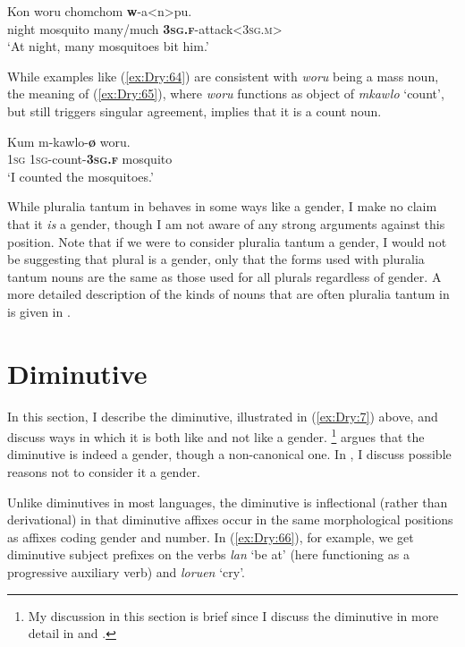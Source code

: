 \documentclass[output=collectionpaper]{langsci/langscibook}
\begin{document}
\ea    \label{ex:Dry:64}
\gll Kon	woru	chomchom	\textbf{w}-a<n>pu.\\
night mosquito many/much \textbf{\textsc{3sg.f}}-attack<\textsc{3sg.m}>\\
\glt `At night, many mosquitoes bit him.'
\z

While examples like (\ref{ex:Dry:64}) are consistent with \textit{woru} being a mass noun, the meaning of (\ref{ex:Dry:65}), where \textit{woru} functions as object of \textit{mkawlo} `count', but still triggers singular agreement, implies that it is a count noun.

\ea \label{ex:Dry:65}
\gll Kum	m-kawlo-\textbf{ø}	woru.\\
\textsc{1sg} \textsc{1sg}-count-\textbf{\textsc{3sg.f}} mosquito\\
\glt  `I counted the mosquitoes.'
\z

While pluralia tantum in  behaves in some ways like a gender, I make no claim that it \textit{is} a gender, though I am not aware of any strong arguments against this position. Note that if we were to consider pluralia tantum a gender, I would not be suggesting that plural is a gender, only that the forms used with pluralia tantum nouns are the same as those used for all plurals regardless of gender. A more detailed description of the kinds of nouns that are often pluralia tantum in  is given in \citet{DryerInpreparation}.

\section{Diminutive}
\label{sec:Dry:5}

In this section, I describe the  diminutive, illustrated in (\ref{ex:Dry:7}) above, and discuss ways in which it is both like and not like a gender.%
\footnote{My discussion in this section is brief since I discuss the  diminutive in more detail in \citet{DryerUnderrevision} and \citet{Dryer2016}.} %
\citet[149]{Corbett2012} argues that the  diminutive is indeed a gender, though a non-canonical one. In \citet{Dryer2016}, I discuss possible reasons not to consider it a gender.

Unlike diminutives in most languages, the  diminutive is inflectional (rather than derivational) in that diminutive affixes occur in the same morphological positions as affixes coding gender and number. In (\ref{ex:Dry:66}), for example, we get diminutive subject prefixes on the verbs \textit{lan} `be at' (here functioning as a progressive auxiliary verb) and \textit{loruen} `cry'.
\end{document}
